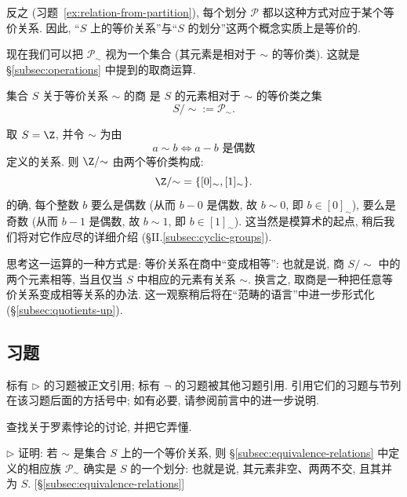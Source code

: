 反之 (习题~\ref{ex:relation-from-partition}), 每个划分 $\mathscr{P}$ 都以这种方式对应于某个等价关系. 因此, ``$S$ 上的等价关系''与``$S$ 的划分''这两个概念实质上是等价的.

现在我们可以把 $\mathscr{P}_{\sim}$ 视为一个集合 (其元素是相对于 $\sim$ 的等价类). 这就是 \S\ref{subsec:operations} 中提到的取商运算.

\begin{definition}[商]
\label{def:quotient}
集合 $S$ 关于等价关系 $\sim$ 的商%
是 $S$ 的元素相对于 $\sim$ 的等价类之集
\[
S / {\sim} := \mathscr{P}_{\sim}.
\]
\end{definition}

\begin{example}
\label{ex:mod-two}
取 $S = \Z$, 并令 $\sim$ 为由
\[
a \sim b \iff a - b \text{ 是偶数}
\]
定义的关系. 则 $\Z / {\sim}$ 由两个等价类构成:
\[
\Z / {\sim} = \{[0]_{\sim}, [1]_{\sim}\}.
\]
的确, 每个整数 $b$ 要么是偶数 (从而 $b - 0$ 是偶数, 故 $b \sim 0$, 即 $b \in [0]_{\sim}$), 要么是奇数 (从而 $b - 1$ 是偶数, 故 $b \sim 1$, 即 $b \in [1]_{\sim}$). 这当然是模算术的起点, 稍后我们将对它作应尽的详细介绍 (\S II.\ref{subsec:cyclic-groups}).

思考这一运算的一种方式是: 等价关系在商中``变成相等'': 也就是说, 商 $S/{\sim}$ 中的两个元素相等, 当且仅当 $S$ 中相应的元素有关系 $\sim$. 换言之, 取商是一种把任意等价关系变成相等关系的办法. 这一观察稍后将在``范畴的语言''中进一步形式化 (\S\ref{subsec:quotients-up}).
\end{example}

\subsection*{习题}
{}

标有 $\triangleright$ 的习题被正文引用; 标有 $\neg$ 的习题被其他习题引用. 引用它们的习题与节列在该习题后面的方括号中; 如有必要, 请参阅前言中的进一步说明.

\begin{prob}
\label{ex:russell}
查找关于罗素悖论的讨论, 并把它弄懂.
\end{prob}

\begin{prob}
\label{ex:partition-from-relation}
$\triangleright$ 证明: 若 $\sim$ 是集合 $S$ 上的一个等价关系, 则 \S\ref{subsec:equivalence-relations} 中定义的相应族 $\mathscr{P}_{\sim}$ 确实是 $S$ 的一个划分: 也就是说, 其元素非空、两两不交, 且其并为 $S$. [\S\ref{subsec:equivalence-relations}]
\end{prob}

